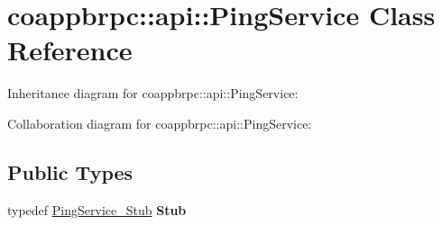\hypertarget{classcoappbrpc_1_1api_1_1PingService}{}\section{coappbrpc\+:\+:api\+:\+:Ping\+Service Class Reference}
\label{classcoappbrpc_1_1api_1_1PingService}


Inheritance diagram for coappbrpc\+:\+:api\+:\+:Ping\+Service\+:


Collaboration diagram for coappbrpc\+:\+:api\+:\+:Ping\+Service\+:
\subsection*{Public Types}
\begin{DoxyCompactItemize}
\item 
\mbox{\label{classcoappbrpc_1_1api_1_1PingService_aeb60e16758df22c66e94b144823956de}} 
typedef \hyperlink{classcoappbrpc_1_1api_1_1PingService__Stub}{Ping\+Service\+\_\+\+Stub} {\bfseries Stub}
\end{DoxyCompactItemize}
